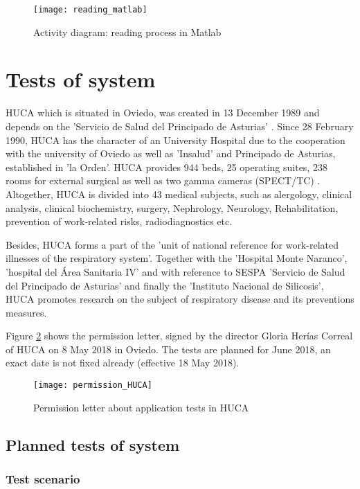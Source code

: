 \begin{figure}
\centering
\texttt{[image: reading\_matlab]} 
\caption{\label{fig:reading_matlab}Activity diagram: reading process in Matlab} 
\end{figure}

\section{Tests of system}\label{tests}

\ac{HUCA} which is situated in Oviedo, was created in 13 December 1989 and depends on the 'Servicio de Salud del Principado de Asturias' \cite{huca}. Since 28 February 1990, HUCA has the character of an University Hospital due to the cooperation with the university of Oviedo as well as 'Insalud' and Principado de Asturias, established in 'la Orden'. 
HUCA provides 944 beds, 25 operating suites, 238 rooms for external surgical as well as two gamma cameras (\ac{SPECT}/\ac{TC}) \cite{huca}. Altogether, HUCA is divided into 43 medical subjects, such as alergology, clinical analysis, clinical biochemistry, surgery, Nephrology, Neurology, Rehabilitation, prevention of work-related risks, radiodiagnostics etc. 

Besides, HUCA forms a part of the 'unit of national reference for work-related illnesses of the respiratory system'. Together with the 'Hospital Monte Naranco', 'hospital del Área Sanitaria IV' and with reference to \ac{SESPA} 'Servicio de Salud del Principado de Asturias' and finally the 'Instituto Nacional de Silicosis', HUCA promotes research on the subject of respiratory disease and its preventions measures.

Figure \ref{fig:permission} shows the permission letter, signed by the director Gloria Herías Correal of HUCA on 8 May 2018 in Oviedo.
The tests are planned for June 2018, an exact date is not fixed already (effective 18 May 2018). 

\begin{figure}
\centering
\texttt{[image: permission\_HUCA]} 
\caption{\label{fig:permission}Permission letter about application tests in HUCA} 
\end{figure}

\subsection{Planned tests of system}

\subsubsection{Test scenario}

